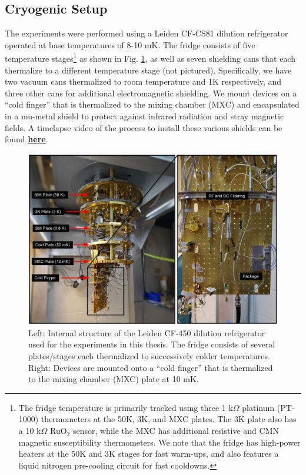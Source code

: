 

\subsection{Cryogenic Setup}

The experiments were performed using a Leiden CF-CS81 dilution refrigerator operated at base temperatures of 8-10 mK. The fridge consists of five temperature stages\footnote{The fridge temperature is primarily tracked using three 1 k$\Omega$ platinum (PT-1000) thermometers at the 50K, 3K, and MXC plates. The 3K plate also has a 10 k$\Omega$ RuO$_2$ sensor, while the MXC has additional resistive and CMN magnetic susceptibility thermometers. We note that the fridge has high-power heaters at the 50K and 3K stages for fast warm-ups, and also features a liquid nitrogen pre-cooling circuit for fast cooldowns.} as shown in Fig. \ref{fig:4-fridge-wiring}, as well as seven shielding cans that each thermalize to a different temperature stage (not pictured). Specifically, we have two vacuum cans thermalized to room temperature and 1K respectively, and three other cans for additional electromagnetic shielding. We mount devices on a ``cold finger'' that is thermalized to the mixing chamber (MXC) and encapsulated in a mu-metal shield to protect against infrared radiation and stray magnetic fields. A timelapse video of the process to install these various shields can be found \href{https://youtu.be/KkvUc9Aw77s?t=829}{\textbf{here}}. 

\begin{figure}[h]
    \centering
    \includegraphics[width=0.9\linewidth]{Figures/4/Fridge-Wiring.pdf}
    \caption[Internal structure of the Leiden CF-450 dilution refrigerator used for the experiments in this thesis.]{Left: Internal structure of the Leiden CF-450 dilution refrigerator used for the experiments in this thesis. The fridge consists of several plates/stages each thermalized to successively colder temperatures. Right: Devices are mounted onto a ``cold finger'' that is thermalized to the mixing chamber (MXC) plate at 10 mK.}
    \label{fig:4-fridge-wiring}
\end{figure}
\clearpage

